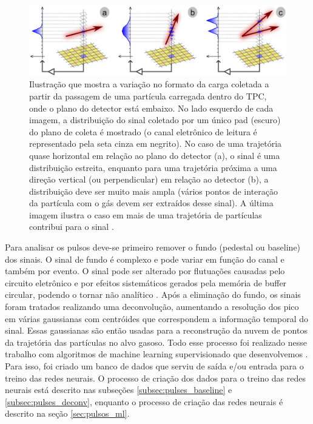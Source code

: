 \documentclass[a4paper,12pt,oneside]{book}
\begin{document}

\begin{figure}[H]
    \centering
    \includegraphics[scale = 0.29]{figs/get.png}
    \caption{Ilustração que mostra a variação no formato da carga coletada a partir da passagem de uma partícula carregada dentro do TPC, onde o plano do detector está embaixo. No lado esquerdo de cada imagem, a distribuição do sinal coletado por um único pad (escuro) do plano de coleta é mostrado (o canal eletrônico de leitura é representado pela seta cinza em negrito). No caso de uma trajetória quase horizontal em relação ao plano do detector (a), o sinal é uma distribuição estreita, enquanto para uma trajetória próxima a uma direção vertical (ou perpendicular) em relação ao detector (b), a distribuição deve ser muito mais ampla (vários pontos de interação da partícula com o gás devem ser extraídos desse sinal). A última imagem ilustra o caso em mais de uma trajetória de partículas contribui para o sinal \cite{GET}.}
    \label{fig:get_signal}
\end{figure}

\par Para analisar os pulsos deve-se primeiro remover o fundo (pedestal ou baseline) dos sinais. O sinal de fundo é complexo e pode variar em função do canal e também por evento. O sinal pode ser alterado por flutuações causadas pelo circuito eletrônico e por efeitos sistemáticos gerados pela memória de buffer circular, podendo o tornar não analítico \cite{FORTINO2022166497, GET}. Após a eliminação do fundo, os sinais foram tratados realizando uma deconvolução, aumentando a resolução dos pico em várias gaussianas com centróides que correspondem a informação temporal do sinal. Essas gaussianas são então usadas para a reconstrução da nuvem de pontos da trajetória das partículas no alvo gasoso. Todo esse processo foi realizado nesse trabalho com algoritmos de machine learning supervisionado que desenvolvemos \cite{FORTINO2022166497}. Para isso, foi criado um banco de dados que serviu de saída e/ou entrada para o treino das redes neurais. O processo de criação dos dados para o treino das redes neurais está descrito nas subseções \ref{subsec:pulses_baseline} e \ref{subsec:pulses_deconv}, enquanto o processo de criação das redes neurais é descrito na seção \ref{sec:pulsos_ml}. 
\end{document}
